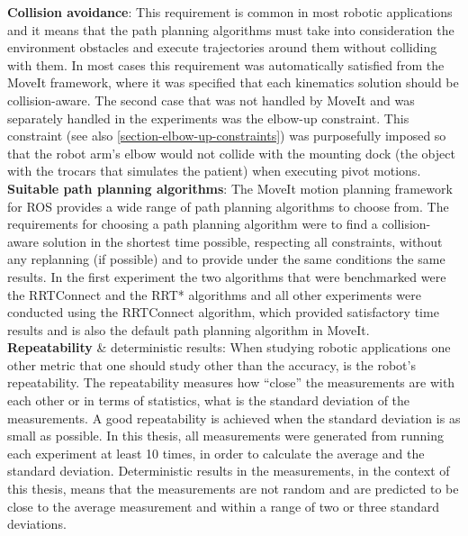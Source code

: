 \textbf{Collision avoidance}: This requirement is common in most robotic applications and it means that the path planning algorithms must take into consideration the environment obstacles and execute trajectories around them without 
colliding with them. In most cases this requirement was automatically satisfied from the MoveIt framework, where it was specified that each kinematics solution should be collision-aware. The second case that was not handled 
by MoveIt and was separately handled in the experiments was the elbow-up constraint. This constraint (see also \ref{section-elbow-up-constraints}) was purposefully imposed so that the robot arm’s elbow would not collide with 
the mounting dock (the object with the trocars that simulates the patient) when executing pivot motions.\\

\textbf{Suitable path planning algorithms}: The MoveIt motion planning framework for ROS provides a wide range of path planning algorithms to choose from. The requirements for choosing a path planning algorithm were to find a 
collision-aware solution in the shortest time possible, respecting all constraints, without any replanning (if possible) and to provide under the same conditions the same results. In the first experiment the two algorithms 
that were benchmarked were the RRTConnect and the RRT* algorithms and all other experiments were conducted using the RRTConnect algorithm, which provided satisfactory time results and is also the default path planning 
algorithm in MoveIt.\\

\textbf{Repeatability} \& deterministic results: When studying robotic applications one other metric that one should study other than the accuracy, is the robot’s repeatability. The repeatability measures how “close” the measurements 
are with each other or in terms of statistics, what is the standard deviation of the measurements. A good repeatability is achieved when the standard deviation is as small as possible. In this thesis, all measurements were 
generated from running each experiment at least 10 times, in order to calculate the average and the standard deviation. Deterministic results in the measurements, in the context of this thesis, means that the measurements are 
not random and are predicted to be close to the average measurement and within a range of two or three standard deviations.\\

